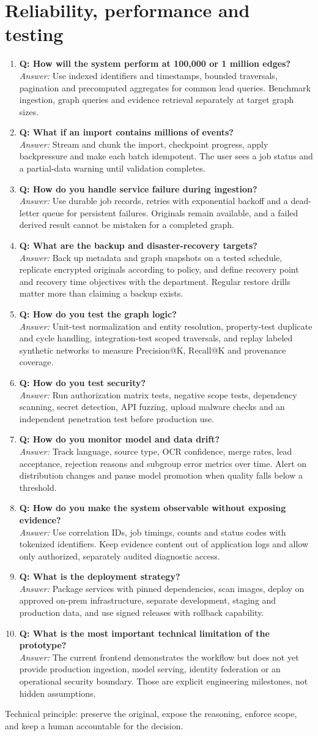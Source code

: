 \documentclass[10pt,a4paper]{article}
\newcommand{\qa}[2]{\item \textbf{\color{navy}Q: #1}\\[-1pt]{\color{coral}\textit{Answer:}} #2}
\begin{document}
\section{Reliability, performance and testing}
\begin{enumerate}[resume]
\qa{How will the system perform at 100,000 or 1 million edges?}{Use indexed identifiers and timestamps, bounded traversals, pagination and precomputed aggregates for common lead queries. Benchmark ingestion, graph queries and evidence retrieval separately at target graph sizes.}
\qa{What if an import contains millions of events?}{Stream and chunk the import, checkpoint progress, apply backpressure and make each batch idempotent. The user sees a job status and a partial-data warning until validation completes.}
\qa{How do you handle service failure during ingestion?}{Use durable job records, retries with exponential backoff and a dead-letter queue for persistent failures. Originals remain available, and a failed derived result cannot be mistaken for a completed graph.}
\qa{What are the backup and disaster-recovery targets?}{Back up metadata and graph snapshots on a tested schedule, replicate encrypted originals according to policy, and define recovery point and recovery time objectives with the department. Regular restore drills matter more than claiming a backup exists.}
\qa{How do you test the graph logic?}{Unit-test normalization and entity resolution, property-test duplicate and cycle handling, integration-test scoped traversals, and replay labeled synthetic networks to measure Precision@K, Recall@K and provenance coverage.}
\qa{How do you test security?}{Run authorization matrix tests, negative scope tests, dependency scanning, secret detection, API fuzzing, upload malware checks and an independent penetration test before production use.}
\qa{How do you monitor model and data drift?}{Track language, source type, OCR confidence, merge rates, lead acceptance, rejection reasons and subgroup error metrics over time. Alert on distribution changes and pause model promotion when quality falls below a threshold.}
\qa{How do you make the system observable without exposing evidence?}{Use correlation IDs, job timings, counts and status codes with tokenized identifiers. Keep evidence content out of application logs and allow only authorized, separately audited diagnostic access.}
\qa{What is the deployment strategy?}{Package services with pinned dependencies, scan images, deploy on approved on-prem infrastructure, separate development, staging and production data, and use signed releases with rollback capability.}
\qa{What is the most important technical limitation of the prototype?}{The current frontend demonstrates the workflow but does not yet provide production ingestion, model serving, identity federation or an operational security boundary. Those are explicit engineering milestones, not hidden assumptions.}
\end{enumerate}
\vfill
\begin{center}\small\color{teal}Technical principle: preserve the original, expose the reasoning, enforce scope, and keep a human accountable for the decision.\end{center}
\end{document}
